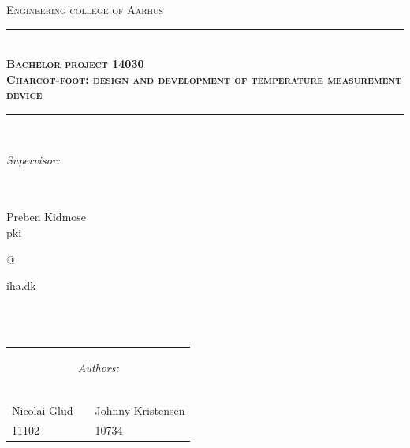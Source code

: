 \newcommand{\HRule}{\rule{\linewidth}{0.5mm}} %

\begin{center} %
 

\textsc{\LARGE Engineering college of Aarhus}\\[1.5cm] %

\HRule \\[0.4cm]
{ \Large \bfseries \textsc{Bachelor project 14030}}\\ %
{ \huge \bfseries \textsc{Charcot-foot: design and development of temperature measurement device}}\\[0.4cm] %
\HRule \\[1.5cm]

\begin{center}
\begin{Large}\textit{Supervisor:}\end{Large}\\
\ \\
Preben Kidmose\\
pki\begin{Large}@\end{Large}iha.dk
\end{center}
\ \\
\ \\
\begin{table}[H]
\centering
\begin{tabular}{p{4cm} c p{4cm}}
\multicolumn{3}{c}{\begin{Large}\textit{Authors:}\end{Large}}\\
\\
\\
\cline{1-1} \cline{3-3}\\
Nicolai Glud & & Johnny Kristensen \\
11102 & & 10734
\end{tabular}
\end{table}
\ \\


\end{center}
